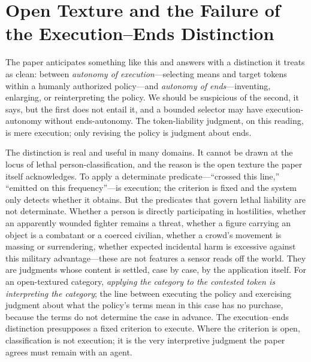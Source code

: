\documentclass[11pt]{article}
\begin{document}
\section{Open Texture and the Failure of the Execution--Ends Distinction}
\label{sec:opentexture}

The paper anticipates something like this and answers with a distinction it treats as clean: between \emph{autonomy of execution}---selecting means and target tokens within a humanly authorized policy---and \emph{autonomy of ends}---inventing, enlarging, or reinterpreting the policy. We should be suspicious of the second, it says, but the first does not entail it, and a bounded selector may have execution-autonomy without ends-autonomy. The token-liability judgment, on this reading, is mere execution; only revising the policy is judgment about ends.

The distinction is real and useful in many domains. It cannot be drawn at the locus of lethal person-classification, and the reason is the open texture the paper itself acknowledges. To apply a determinate predicate---``crossed this line,'' ``emitted on this frequency''---is execution; the criterion is fixed and the system only detects whether it obtains. But the predicates that govern lethal liability are not determinate. Whether a person is directly participating in hostilities, whether an apparently wounded fighter remains a threat, whether a figure carrying an object is a combatant or a coerced civilian, whether a crowd's movement is massing or surrendering, whether expected incidental harm is excessive against this military advantage---these are not features a sensor reads off the world. They are judgments whose content is settled, case by case, by the application itself. For an open-textured category, \emph{applying the category to the contested token is interpreting the category}; the line between executing the policy and exercising judgment about what the policy's terms mean in this case has no purchase, because the terms do not determine the case in advance. The execution--ends distinction presupposes a fixed criterion to execute. Where the criterion is open, classification is not execution; it is the very interpretive judgment the paper agrees must remain with an agent.
\end{document}
